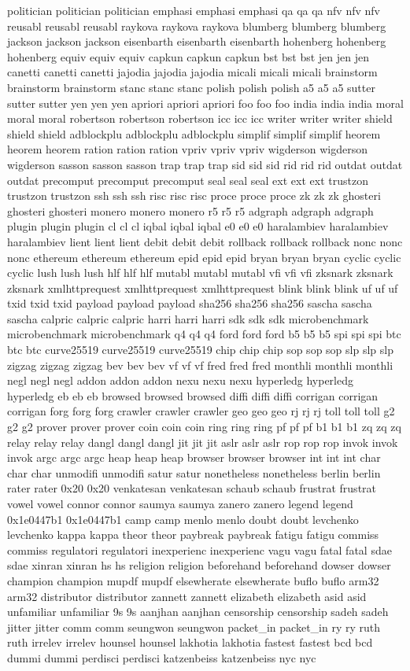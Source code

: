 \documentclass[conference]{IEEEtran}
\begin{document}
politician politician politician emphasi emphasi emphasi qa qa qa nfv nfv nfv reusabl reusabl reusabl raykova raykova raykova blumberg blumberg blumberg jackson jackson jackson eisenbarth eisenbarth eisenbarth hohenberg hohenberg hohenberg equiv equiv equiv capkun capkun capkun bst bst bst jen jen jen canetti canetti canetti jajodia jajodia jajodia micali micali micali brainstorm brainstorm brainstorm stanc stanc stanc polish polish polish a5 a5 a5 sutter sutter sutter yen yen yen apriori apriori apriori foo foo foo india india india moral moral moral robertson robertson robertson icc icc icc writer writer writer shield shield shield adblockplu adblockplu adblockplu simplif simplif simplif heorem heorem heorem ration ration ration vpriv vpriv vpriv wigderson wigderson wigderson sasson sasson sasson trap trap trap sid sid sid rid rid rid outdat outdat outdat precomput precomput precomput seal seal seal ext ext ext trustzon trustzon trustzon ssh ssh ssh risc risc risc proce proce proce zk zk zk ghosteri ghosteri ghosteri monero monero monero r5 r5 r5 adgraph adgraph adgraph plugin plugin plugin cl cl cl iqbal iqbal iqbal e0 e0 e0 haralambiev haralambiev haralambiev lient lient lient debit debit debit rollback rollback rollback nonc nonc nonc ethereum ethereum ethereum epid epid epid bryan bryan bryan cyclic cyclic cyclic lush lush lush hlf hlf hlf mutabl mutabl mutabl vfi vfi vfi zksnark zksnark zksnark xmlhttprequest xmlhttprequest xmlhttprequest blink blink blink uf uf uf txid txid txid payload payload payload sha256 sha256 sha256 sascha sascha sascha calpric calpric calpric harri harri harri sdk sdk sdk microbenchmark microbenchmark microbenchmark q4 q4 q4 ford ford ford b5 b5 b5 spi spi spi btc btc btc curve25519 curve25519 curve25519 chip chip chip sop sop sop slp slp slp zigzag zigzag zigzag bev bev bev vf vf vf fred fred fred monthli monthli monthli negl negl negl addon addon addon nexu nexu nexu hyperledg hyperledg hyperledg eb eb eb browsed browsed browsed diffi diffi diffi corrigan corrigan corrigan forg forg forg crawler crawler crawler geo geo geo rj rj rj toll toll toll g2 g2 g2 prover prover prover coin coin coin ring ring ring pf pf pf b1 b1 b1 zq zq zq relay relay relay dangl dangl dangl jit jit jit aslr aslr aslr rop rop rop invok invok invok argc argc argc heap heap heap browser browser browser int int int char char char unmodifi unmodifi satur satur nonetheless nonetheless berlin berlin rater rater 0x20 0x20 venkatesan venkatesan schaub schaub frustrat frustrat vowel vowel connor connor saumya saumya zanero zanero legend legend 0x1e0447b1 0x1e0447b1 camp camp menlo menlo doubt doubt levchenko levchenko kappa kappa theor theor paybreak paybreak fatigu fatigu commiss commiss regulatori regulatori inexperienc inexperienc vagu vagu fatal fatal sdae sdae xinran xinran hs hs religion religion beforehand beforehand dowser dowser champion champion mupdf mupdf elsewherate elsewherate buflo buflo arm32 arm32 distributor distributor zannett zannett elizabeth elizabeth asid asid unfamiliar unfamiliar 9s 9s aanjhan aanjhan censorship censorship sadeh sadeh jitter jitter comm comm seungwon seungwon packet_in packet_in ry ry ruth ruth irrelev irrelev hounsel hounsel lakhotia lakhotia fastest fastest bcd bcd dummi dummi perdisci perdisci katzenbeiss katzenbeiss nyc nyc 
\end{document}
